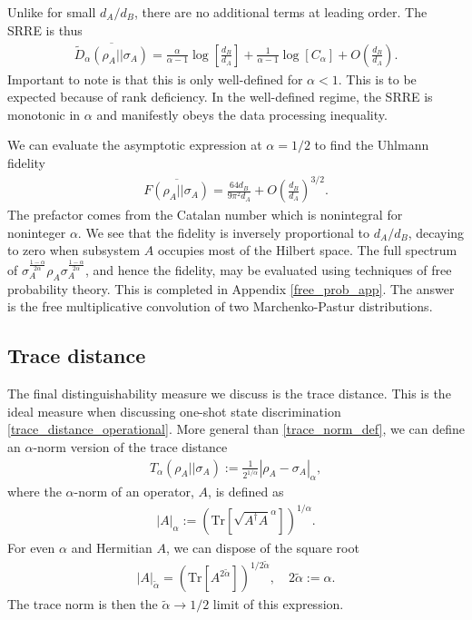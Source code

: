 \documentclass[a4paper,11pt]{article}
\newcommand{\Tr}{\text{Tr}}
\newcommand*{\JKF}[1]{\textcolor{blue}{[JKF: #1]}}
\newcommand*{\SR}[1]{\textcolor{magenta}{[SR: \textsf{#1}]}}
\begin{document}
Unlike for small $d_A/d_B$, there are no additional terms at leading order. The SRRE is thus
\begin{align}
    \overline{\tilde{D}_{\alpha}(\rho_A|| \sigma_A)} = \frac{\alpha}{{\alpha}-1}\log \left[\frac{d_B}{d_A} \right]+ \frac{1}{{\alpha}-1}\log\left[ C_{\alpha}\right] + O\left(\frac{d_B}{d_A}\right).
    \label{SRRE_largedA}
\end{align}
Important to note is that this is only well-defined for ${\alpha} < 1$. This is to be expected because of rank deficiency. In the well-defined regime, the SRRE is monotonic in $\alpha$ and manifestly obeys the data processing inequality.

We can evaluate the asymptotic expression at $\alpha = 1/2$ to find the Uhlmann fidelity
\begin{align}
    \overline{F(\rho_A || \sigma_A)} = \frac{64d_B}{9\pi^2d_A} + O\left( \frac{d_B}{d_A}\right)^{3/2}.
\end{align}
The prefactor comes from the Catalan number which is nonintegral for noninteger $\alpha$. We see that the fidelity is inversely proportional to $d_A/d_B$, decaying to zero when subsystem $A$ occupies most of the Hilbert space. The full spectrum of $\sigma_A^{\frac{1-\alpha}{2\alpha}}\rho_A\sigma_A^{\frac{1-\alpha}{2\alpha}}$, and hence the fidelity, may be evaluated using techniques of free probability theory. This is completed in Appendix \ref{free_prob_app}. The answer is the free multiplicative convolution of two Marchenko-Pastur distributions.



\subsection{Trace distance}

The final distinguishability measure we discuss is the trace distance. This is the ideal measure when discussing one-shot state discrimination \eqref{trace_distance_operational}. More general than \eqref{trace_norm_def}, we can define an $\alpha$-norm version of the trace distance
\begin{align}
    T_{\alpha}(\rho_A|| \sigma_A) := \frac{1}{2^{1/{\alpha}}}|\rho_A -\sigma_A|_{\alpha},
\end{align}
where the $\alpha$-norm of an operator, $A$, is defined as
\begin{align}
    |A |_{\alpha} := \left(\Tr \left[ \sqrt{A^{\dagger} A}^{\alpha}\right]\right)^{1/\alpha}.
\end{align}
For even $\alpha$ and Hermitian $A$, we can dispose of the square root
\begin{align}
    |A |_{\tilde{\alpha}} = \left(\Tr \left[  A^{2\tilde{\alpha}}\right]\right)^{1/{2\tilde{\alpha}}}, \quad 2\tilde{\alpha} :=  \alpha.
\end{align}
The trace norm is then the $\tilde{\alpha} \rightarrow 1/2$ limit of this expression.
\end{document}
